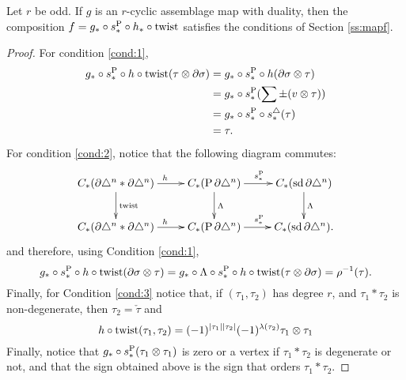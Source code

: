 \begin{proposition} Let $r$ be odd.
	If $g$ is an $r$-cyclic assemblage map with duality, then the composition $f = g_*\circ s_*^{\operatorname{P}}\circ h_*\circ \mathrm{twist}$ satisfies the conditions of Section \ref{ss:mapf}.
\end{proposition}
\begin{proof}
	For condition \ref{cond:1},
	\begin{align*}
		g_*\circ s_*^{\operatorname{P}}\circ h \circ \mathrm{twist}(\tau\otimes \partial\sigma)
		&= g_*\circ s_*^{\operatorname{P}}\circ h (\partial\sigma\otimes \tau)\\
		&= g_*\circ s_*^{\operatorname{P}}(\sum \pm (v\otimes\tau)) \\
		&= g_*\circ s_*^{\operatorname{P}}\circ s_*^{\triangle}(\tau) \\
		&= \tau.
	\end{align*}
	For condition \ref{cond:2}, notice that the following diagram commutes:
	\[\xymatrix{
		C_*(\partial \simplex^n*\partial\simplex^n)\ar[r]^h\ar[d]^{\text{twist}} &C_*(\Psd \partial \simplex^n) \ar[r]^{s_*^{\Psd}}\ar[d]^{\alex}& C_*(\sd \partial \simplex^n)\ar[d]^{\alex}\\
		C_*(\partial \simplex^n*\partial\simplex^n)\ar[r]^h &C_*(\Psd \partial \simplex^n) \ar[r]^{s_*^{\Psd}}& C_*(\sd \partial \simplex^n).
	}\]
	and therefore, using Condition \eqref{cond:1},
	\[
	g_*\circ s_*^{\operatorname{P}}\circ h \circ \mathrm{twist}(\partial\sigma\otimes \tau) = g_*\circ \Lambda\circ s_*^{\operatorname{P}}\circ h \circ \mathrm{twist}(\tau\otimes \partial\sigma) = \rho^{-1}(\tau).
	\]
	Finally, for Condition \ref{cond:3} notice that, if $(\tau_1,\tau_2)$ has degree $r$, and $\tau_1*\tau_2$ is non-degenerate, then $\tau_2 = \check{\tau}$ and
	\[
	h\circ\operatorname{twist}(\tau_1,\tau_2) = (-1)^{|\tau_1||\tau_2|}(-1)^{\lambda(\tau_2)}\tau_1\otimes \tau_1
	\]
	Finally, notice that $g_*\circ s_*^{\operatorname{P}}(\tau_1\otimes \tau_1)$ is zero or a vertex if $\tau_1*\tau_2$ is degenerate or not, and that the sign obtained above is the sign that orders $\tau_1*\tau_2$.
\end{proof}


